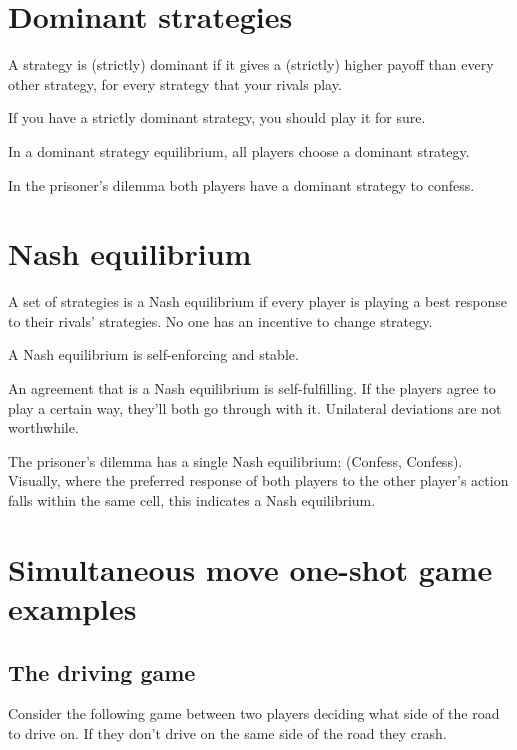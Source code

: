 \documentclass[
  letterpaper,
  DIV=11,
  numbers=noendperiod]{scrreprt}
\begin{document}
\hypertarget{dominant-strategies}{%
\section{Dominant strategies}\label{dominant-strategies}}

A strategy is (strictly) dominant if it gives a (strictly) higher payoff
than every other strategy, for every strategy that your rivals play.

If you have a strictly dominant strategy, you should play it for sure.

In a dominant strategy equilibrium, all players choose a dominant
strategy.

In the prisoner's dilemma both players have a dominant strategy to
confess.

\hypertarget{nash-equilibrium}{%
\section{Nash equilibrium}\label{nash-equilibrium}}

A set of strategies is a Nash equilibrium if every player is playing a
best response to their rivals' strategies. No one has an incentive to
change strategy.

A Nash equilibrium is self-enforcing and stable.

An agreement that is a Nash equilibrium is self-fulfilling. If the
players agree to play a certain way, they'll both go through with it.
Unilateral deviations are not worthwhile.

The prisoner's dilemma has a single Nash equilibrium: (Confess,
Confess). Visually, where the preferred response of both players to the
other player's action falls within the same cell, this indicates a Nash
equilibrium.

\hypertarget{simultaneous-move-one-shot-game-examples}{%
\section{Simultaneous move one-shot game
examples}\label{simultaneous-move-one-shot-game-examples}}

\hypertarget{the-driving-game}{%
\subsection{The driving game}\label{the-driving-game}}

Consider the following game between two players deciding what side of
the road to drive on. If they don't drive on the same side of the road
they crash.
\end{document}
